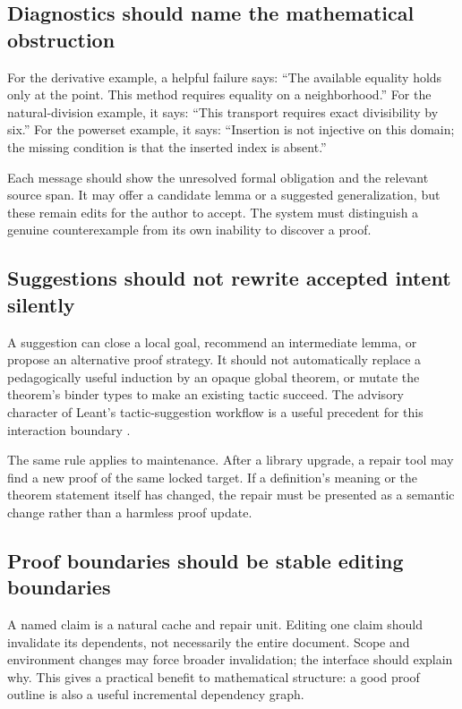 \documentclass[11pt,a4paper]{article}
\theoremstyle{remark}
\begin{document}
\subsection{Diagnostics should name the mathematical obstruction}

For the derivative example, a helpful failure says: ``The available equality holds only at the point. This method requires equality on a neighborhood.'' For the natural-division example, it says: ``This transport requires exact divisibility by six.'' For the powerset example, it says: ``Insertion is not injective on this domain; the missing condition is that the inserted index is absent.''

Each message should show the unresolved formal obligation and the relevant source span. It may offer a candidate lemma or a suggested generalization, but these remain edits for the author to accept. The system must distinguish a genuine counterexample from its own inability to discover a proof.

\subsection{Suggestions should not rewrite accepted intent silently}

A suggestion can close a local goal, recommend an intermediate lemma, or propose an alternative proof strategy. It should not automatically replace a pedagogically useful induction by an opaque global theorem, or mutate the theorem's binder types to make an existing tactic succeed. The advisory character of Leant's tactic-suggestion workflow is a useful precedent for this interaction boundary \cite{leant-readme}.

The same rule applies to maintenance. After a library upgrade, a repair tool may find a new proof of the same locked target. If a definition's meaning or the theorem statement itself has changed, the repair must be presented as a semantic change rather than a harmless proof update.

\subsection{Proof boundaries should be stable editing boundaries}

A named claim is a natural cache and repair unit. Editing one claim should invalidate its dependents, not necessarily the entire document. Scope and environment changes may force broader invalidation; the interface should explain why. This gives a practical benefit to mathematical structure: a good proof outline is also a useful incremental dependency graph.
\end{document}

